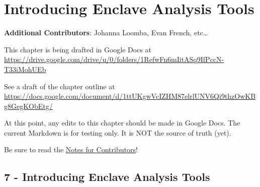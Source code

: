 \documentclass[
  letterpaper,
  DIV=11,
  numbers=noendperiod]{scrreprt}
\begin{document}
\hypertarget{sec-enclave-tools}{%
\chapter{Introducing Enclave Analysis Tools}\label{sec-enclave-tools}}

\textbf{Additional Contributors}: Johanna Loomba, Evan French,
etc\ldots{}

\begin{tcolorbox}[enhanced jigsaw, rightrule=.15mm, colback=white, leftrule=.75mm, breakable, left=2mm, bottomtitle=1mm, opacityback=0, toprule=.15mm, colframe=quarto-callout-note-color-frame, titlerule=0mm, toptitle=1mm, coltitle=black, title=\textcolor{quarto-callout-note-color}{\faInfo}\hspace{0.5em}{Note}, bottomrule=.15mm, arc=.35mm, opacitybacktitle=0.6, colbacktitle=quarto-callout-note-color!10!white]

This chapter is being drafted in Google Docs at
\url{https://drive.google.com/drive/u/0/folders/1RefwFn6mIitASq9IfPccN-T33iMohUEb}

See a draft of the chapter outline at
\url{https://docs.google.com/document/d/1ttUKgwVcIZHM87elrlUNV6Qi9thzOwKBg8GegKObEtg/}

\end{tcolorbox}

\begin{tcolorbox}[enhanced jigsaw, rightrule=.15mm, colback=white, leftrule=.75mm, breakable, left=2mm, bottomtitle=1mm, opacityback=0, toprule=.15mm, colframe=quarto-callout-warning-color-frame, titlerule=0mm, toptitle=1mm, coltitle=black, title=\textcolor{quarto-callout-warning-color}{\faExclamationTriangle}\hspace{0.5em}{Warning}, bottomrule=.15mm, arc=.35mm, opacitybacktitle=0.6, colbacktitle=quarto-callout-warning-color!10!white]

At this point, any edits to this chapter should be made in Google Docs.
The current Markdown is for testing only. It is NOT the source of truth
(yet).

\end{tcolorbox}

Be sure to read the
\href{https://docs.google.com/document/d/1mrZD8oHHp5Xw4lNjmkagvdb1UZsfbuxsVZ3c_MBbUZM}{Notes
for Contributors}!

\hypertarget{introducing-enclave-analysis-tools}{%
\section{7 - Introducing Enclave Analysis
Tools}\label{introducing-enclave-analysis-tools}}
\end{document}
